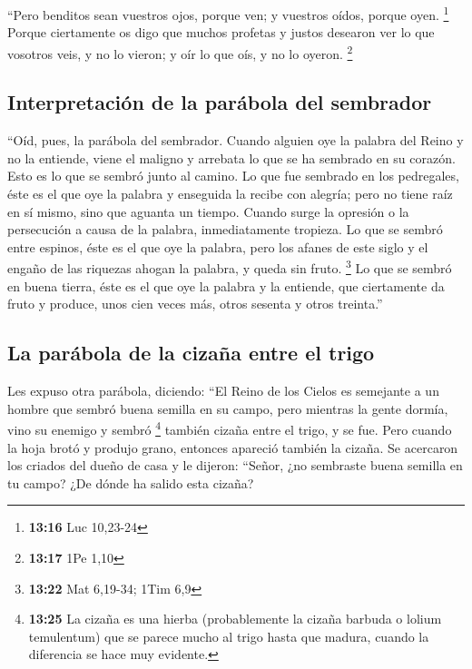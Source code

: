  ``Pero benditos sean vuestros ojos, porque ven; y
vuestros oídos, porque oyen. \footnote{\textbf{13:16} Luc 10,23-24}
 Porque ciertamente os digo que muchos profetas y justos
desearon ver lo que vosotros veis, y no lo vieron; y oír lo que oís, y
no lo oyeron. \footnote{\textbf{13:17} 1Pe 1,10}

\hypertarget{interpretaciuxf3n-de-la-paruxe1bola-del-sembrador}{%
\subsection{Interpretación de la parábola del
sembrador}\label{interpretaciuxf3n-de-la-paruxe1bola-del-sembrador}}

 ``Oíd, pues, la parábola del sembrador. 
Cuando alguien oye la palabra del Reino y no la entiende, viene el
maligno y arrebata lo que se ha sembrado en su corazón. Esto es lo que
se sembró junto al camino.  Lo que fue sembrado en los
pedregales, éste es el que oye la palabra y enseguida la recibe con
alegría;  pero no tiene raíz en sí mismo, sino que
aguanta un tiempo. Cuando surge la opresión o la persecución a causa de
la palabra, inmediatamente tropieza.  Lo que se sembró
entre espinos, éste es el que oye la palabra, pero los afanes de este
siglo y el engaño de las riquezas ahogan la palabra, y queda sin fruto.
\footnote{\textbf{13:22} Mat 6,19-34; 1Tim 6,9}  Lo que
se sembró en buena tierra, éste es el que oye la palabra y la entiende,
que ciertamente da fruto y produce, unos cien veces más, otros sesenta y
otros treinta.''

\hypertarget{la-paruxe1bola-de-la-cizauxf1a-entre-el-trigo}{%
\subsection{La parábola de la cizaña entre el
trigo}\label{la-paruxe1bola-de-la-cizauxf1a-entre-el-trigo}}

 Les expuso otra parábola, diciendo: ``El Reino de los
Cielos es semejante a un hombre que sembró buena semilla en su campo,
 pero mientras la gente dormía, vino su enemigo y sembró
\footnote{\textbf{13:25} La cizaña es una hierba (probablemente la
  cizaña barbuda o lolium temulentum) que se parece mucho al trigo hasta
  que madura, cuando la diferencia se hace muy evidente.} también cizaña
entre el trigo, y se fue.  Pero cuando la hoja brotó y
produjo grano, entonces apareció también la cizaña.  Se
acercaron los criados del dueño de casa y le dijeron: ``Señor, ¿no
sembraste buena semilla en tu campo? ¿De dónde ha salido esta cizaña?

